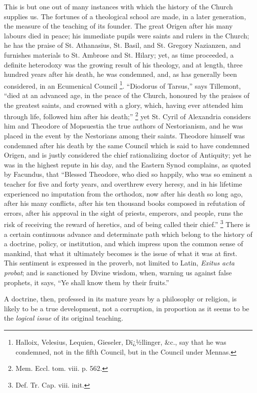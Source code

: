 This is but one out of many instances with which the
history of the Church supplies us. The fortunes of a
theological school are made, in a later generation, the
measure of the teaching of its founder. The great Origen
after his many labours died in peace; his immediate
pupils were saints and rulers in the Church; he has the
praise of St. Athanasius, St. Basil, and St. Gregory
Nazianzen, and furnishes materials to St. Ambrose and St.
Hilary; yet, as time proceeded, a definite heterodoxy was
the growing result of his theology, and at length, three
hundred years after his death, he was condemned, and, as
has generally been considered, in an Ecumenical Council
\footnote{Halloix, Velesius, Lequien,
Gieseler, Dï¿½llinger, \&c., say that he was condemned,
not in the fifth Council, but in the Council under
Mennas.}.
``Diodorus of Tarsus,'' says Tillemont,
``died at an advanced age, in the peace of the
Church, honoured by the praises of the greatest saints,
and crowned with a glory, which, having ever attended him
through life, followed him after his death;'' \footnote{Mem. Eccl. tom. viii. p. 562.} yet St.
Cyril of Alexandria considers him and Theodore of
Mopsuestia the true authors of Nestorianism, and he was
placed in the event by the Nestorians among their saints.
Theodore himself was condemned after his death by the
same Council which is said to have condemned Origen, and
is justly considered the chief rationalizing doctor of
Antiquity; yet he was in the highest repute in his day,
and the Eastern Synod complains, as quoted by Facundus,
that ``Blessed Theodore, who died so happily, who was
so eminent a teacher for five and forty years, and
overthrew every heresy, and in his lifetime experienced
no imputation from the orthodox, now after his death so
long ago, after his many conflicts, after his ten
thousand books composed in refutation of errors, after
his approval in the sight of priests, emperors, and
people, runs the risk of receiving the reward of
heretics, and of being called their chief.'' \footnote{Def. Tr. Cap. viii. init.} There is
a certain continuous advance and determinate path which
belong to the history of a doctrine, policy, or
institution, and which impress upon the common sense of
mankind, that what it ultimately becomes is the issue of
what it was at first. This sentiment is expressed in the
proverb, not limited to Latin, \emph{Exitus acta probat};
and is sanctioned by Divine wisdom, when, warning us
against false prophets, it says, ``Ye shall know them
by their fruits.''

A doctrine, then, professed in its mature years by a
philosophy or religion, is likely to be a true
development, not a corruption, in proportion as it seems
to be the \emph{logical issue} of its original teaching.

